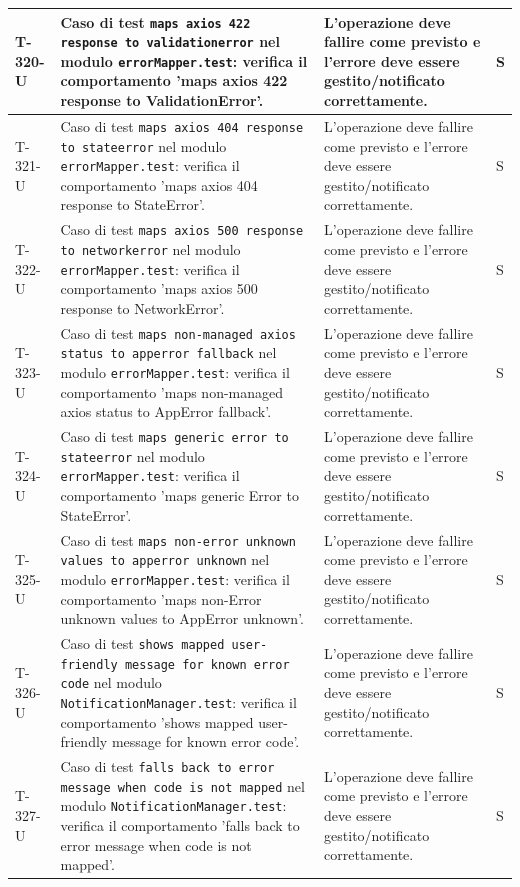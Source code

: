 \documentclass[a4paper,12pt]{article}
\begin{document}
{{\begin{longtable}{|>{\RaggedRight\arraybackslash}p{1.55cm}|>{\RaggedRight\arraybackslash}p{8.0cm}|>{\RaggedRight\arraybackslash}p{4.6cm}|>{\RaggedRight\arraybackslash}p{1.2cm}|}
        \hline
        T-320-U & Caso di test \texttt{maps axios 422 response to validationerror} nel modulo \texttt{errorMapper.test}: verifica il comportamento 'maps axios 422 response to ValidationError'. & L'operazione deve fallire come previsto e l'errore deve essere gestito/notificato correttamente. & S \\
        \hline
        T-321-U & Caso di test \texttt{maps axios 404 response to stateerror} nel modulo \texttt{errorMapper.test}: verifica il comportamento 'maps axios 404 response to StateError'. & L'operazione deve fallire come previsto e l'errore deve essere gestito/notificato correttamente. & S \\
        \hline
        T-322-U & Caso di test \texttt{maps axios 500 response to networkerror} nel modulo \texttt{errorMapper.test}: verifica il comportamento 'maps axios 500 response to NetworkError'. & L'operazione deve fallire come previsto e l'errore deve essere gestito/notificato correttamente. & S \\
        \hline
        T-323-U & Caso di test \texttt{maps non-managed axios status to apperror fallback} nel modulo \texttt{errorMapper.test}: verifica il comportamento 'maps non-managed axios status to AppError fallback'. & L'operazione deve fallire come previsto e l'errore deve essere gestito/notificato correttamente. & S \\
        \hline
        T-324-U & Caso di test \texttt{maps generic error to stateerror} nel modulo \texttt{errorMapper.test}: verifica il comportamento 'maps generic Error to StateError'. & L'operazione deve fallire come previsto e l'errore deve essere gestito/notificato correttamente. & S \\
        \hline
        T-325-U & Caso di test \texttt{maps non-error unknown values to apperror unknown} nel modulo \texttt{errorMapper.test}: verifica il comportamento 'maps non-Error unknown values to AppError unknown'. & L'operazione deve fallire come previsto e l'errore deve essere gestito/notificato correttamente. & S \\
        \hline
        T-326-U & Caso di test \texttt{shows mapped user-friendly message for known error code} nel modulo \texttt{NotificationManager.test}: verifica il comportamento 'shows mapped user-friendly message for known error code'. & L'operazione deve fallire come previsto e l'errore deve essere gestito/notificato correttamente. & S \\
        \hline
        T-327-U & Caso di test \texttt{falls back to error message when code is not mapped} nel modulo \texttt{NotificationManager.test}: verifica il comportamento 'falls back to error message when code is not mapped'. & L'operazione deve fallire come previsto e l'errore deve essere gestito/notificato correttamente. & S \\

\end{longtable}}}
\end{document}
